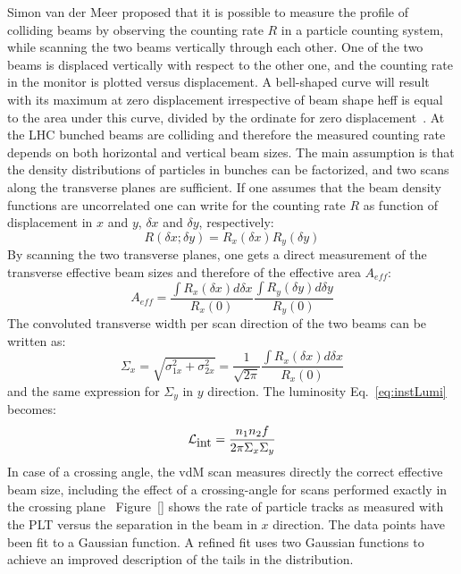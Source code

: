 Simon van der Meer proposed that it is possible to measure the profile of colliding beams
by observing the counting rate $R$ in a particle counting system, while scanning the two
beams vertically through each other. One of the two beams is displaced vertically with respect
to the other one, and the counting rate in the monitor is plotted versus displacement.
A bell-shaped curve will result with its maximum at zero displacement
irrespective of beam shape heff is equal to the area under this curve,
divided by the ordinate for zero displacement~\cite{vanderMeer:296752}.
%
At the LHC bunched beams are colliding and therefore the measured counting rate
depends on both horizontal and vertical beam sizes. The main assumption is that the
density distributions of particles in bunches can be factorized, and two scans along
the transverse planes are sufficient. If one assumes that the beam density functions
are uncorrelated one can write for the counting rate $R$ as function of displacement
in $x$ and $y$, $\delta x$ and $\delta y$, respectively:
\begin{equation}
R(\delta x;\delta y) = R_x(\delta x) R_y(\delta y)
\end{equation}
By scanning the two transverse planes, one gets a direct measurement of the transverse
effective beam sizes and therefore of the effective area $A_{eff}$:
\begin{equation}
A_{eff} = \frac{\int R_x(\delta x) d\delta x}{R_x(0)} \frac{\int R_y(\delta y) d\delta y}{R_y(0)}
\end{equation}
The convoluted transverse width per scan direction of the two beams can be written as:
\begin{equation}
\Sigma_x = \sqrt{\sigma_{1x}^2+\sigma_{2x}^2} = \frac{1}{\sqrt{2\pi}}\frac{\int R_x(\delta x) d\delta x}{R_x(0)}
\end{equation}
and the same expression for $\Sigma_y$ in $y$ direction. The luminosity Eq.~\ref{eq:instLumi} becomes:
\begin{equation}
{\cal L}_{\mbox{int}} = \frac{n_1 n_2 f}{2\pi \Sigma_x \Sigma_y}
\end{equation}
In case of a crossing angle, the vdM scan measures directly the correct effective
beam size, including the effect of a crossing-angle for scans performed exactly in the
crossing plane~\cite{White:1308187}
%
Figure~\ref{} shows the rate of particle tracks as measured with the PLT versus
the separation in the beam in $x$ direction. The data points have been fit to a Gaussian
function. A refined fit uses two Gaussian functions to achieve an improved description
of the tails in the distribution.


